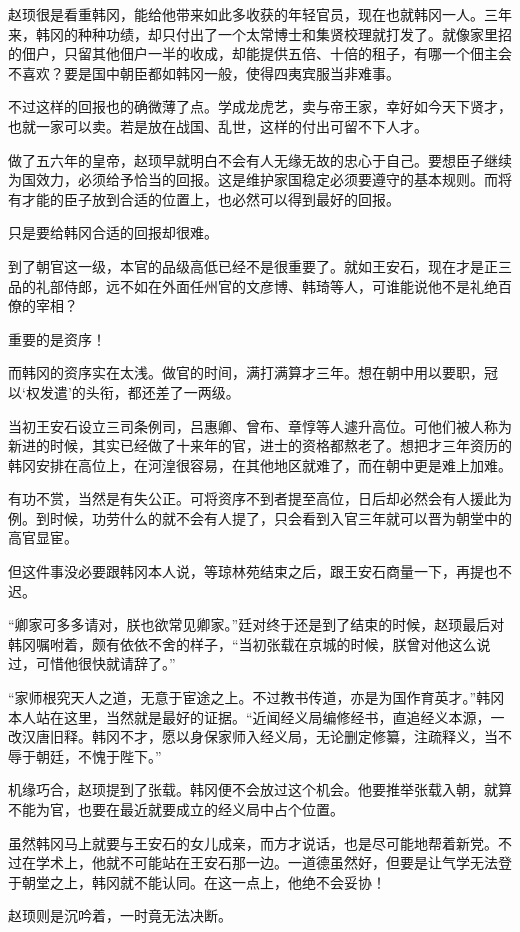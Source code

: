 赵顼很是看重韩冈，能给他带来如此多收获的年轻官员，现在也就韩冈一人。三年来，韩冈的种种功绩，却只付出了一个太常博士和集贤校理就打发了。就像家里招的佃户，只留其他佃户一半的收成，却能提供五倍、十倍的租子，有哪一个佃主会不喜欢？要是国中朝臣都如韩冈一般，使得四夷宾服当非难事。

不过这样的回报也的确微薄了点。学成龙虎艺，卖与帝王家，幸好如今天下贤才，也就一家可以卖。若是放在战国、乱世，这样的付出可留不下人才。

做了五六年的皇帝，赵顼早就明白不会有人无缘无故的忠心于自己。要想臣子继续为国效力，必须给予恰当的回报。这是维护家国稳定必须要遵守的基本规则。而将有才能的臣子放到合适的位置上，也必然可以得到最好的回报。

只是要给韩冈合适的回报却很难。

到了朝官这一级，本官的品级高低已经不是很重要了。就如王安石，现在才是正三品的礼部侍郎，远不如在外面任州官的文彦博、韩琦等人，可谁能说他不是礼绝百僚的宰相？

重要的是资序！

而韩冈的资序实在太浅。做官的时间，满打满算才三年。想在朝中用以要职，冠以‘权发遣’的头衔，都还差了一两级。

当初王安石设立三司条例司，吕惠卿、曾布、章惇等人遽升高位。可他们被人称为新进的时候，其实已经做了十来年的官，进士的资格都熬老了。想把才三年资历的韩冈安排在高位上，在河湟很容易，在其他地区就难了，而在朝中更是难上加难。

有功不赏，当然是有失公正。可将资序不到者提至高位，日后却必然会有人援此为例。到时候，功劳什么的就不会有人提了，只会看到入官三年就可以晋为朝堂中的高官显宦。

但这件事没必要跟韩冈本人说，等琼林苑结束之后，跟王安石商量一下，再提也不迟。

“卿家可多多请对，朕也欲常见卿家。”廷对终于还是到了结束的时候，赵顼最后对韩冈嘱咐着，颇有依依不舍的样子，“当初张载在京城的时候，朕曾对他这么说过，可惜他很快就请辞了。”

“家师根究天人之道，无意于宦途之上。不过教书传道，亦是为国作育英才。”韩冈本人站在这里，当然就是最好的证据。“近闻经义局编修经书，直追经义本源，一改汉唐旧释。韩冈不才，愿以身保家师入经义局，无论删定修纂，注疏释义，当不辱于朝廷，不愧于陛下。”

机缘巧合，赵顼提到了张载。韩冈便不会放过这个机会。他要推举张载入朝，就算不能为官，也要在最近就要成立的经义局中占个位置。

虽然韩冈马上就要与王安石的女儿成亲，而方才说话，也是尽可能地帮着新党。不过在学术上，他就不可能站在王安石那一边。一道德虽然好，但要是让气学无法登于朝堂之上，韩冈就不能认同。在这一点上，他绝不会妥协！

赵顼则是沉吟着，一时竟无法决断。

